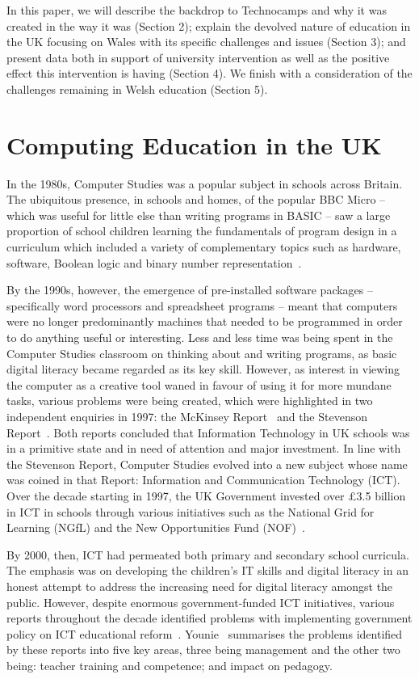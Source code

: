 \documentclass{sig-alternate}
\begin{document}
In this paper, we will describe the backdrop to Technocamps and why it
was created in the way it was (Section 2); explain the devolved nature
of education in the UK focusing on Wales with its specific challenges
and issues (Section 3); and present data both in support of university
intervention as well as the positive effect this intervention is
having (Section 4).  We finish with a consideration of the challenges
remaining in Welsh education (Section 5).

\section{Computing Education in the UK}

In the 1980s, Computer Studies was a popular subject
in schools across Britain. The ubiquitous presence, in schools and homes,
of the popular BBC Micro -- which was useful for little else than
writing programs in BASIC -- saw a large proportion
of school children learning the fundamentals of program design
in a curriculum which included a variety of complementary
topics such as hardware, software, Boolean logic
and binary number representation~\cite{Doyle:1988}.

By the 1990s, however, the emergence of pre-installed software
packages -- specifically word processors and spreadsheet programs --
meant that computers were no longer predominantly machines that needed
to be programmed in order to do anything useful or interesting.  Less
and less time was being spent in the Computer Studies classroom on
thinking about and writing programs, as basic digital literacy became
regarded as its key skill.  However, as interest in viewing the
computer as a creative tool waned in favour of using it for more
mundane tasks, various problems were being created, which were
highlighted in two independent enquiries in 1997: the McKinsey
Report~\cite{McKinsey:1997} and the Stevenson
Report~\cite{Stevenson:1997}.  Both reports concluded that Information
Technology in UK schools was in a primitive state and in need of
attention and major investment.  In line with the Stevenson
Report, Computer Studies evolved into a new
subject whose name was coined in that Report: Information and
Communication Technology (ICT).  Over the decade starting in 1997, the
UK Government invested over \pounds3.5 billion in ICT in schools
through various initiatives such as the National Grid for Learning
(NGfL) and the New Opportunities Fund (NOF)~\cite{Doughty:2006}.

By 2000, then, ICT had permeated both primary and secondary school
curricula.  The emphasis was on developing the children's IT skills
and digital literacy in an honest attempt to address the increasing
need for digital literacy amongst the public.  However, despite
enormous government-funded ICT initiatives, various reports throughout
the decade identified problems with implementing government policy on
ICT educational
reform~\cite{OpieFukuyo:2000,Ofsted:2001,Ofsted:2002,Ofsted:2004,
Loveless:2005}.  Younie~\cite{Younie:2006} summarises the problems
identified by these reports into five key areas, three being
management and the other two being: teacher training and competence;
and impact on pedagogy.
\end{document}
